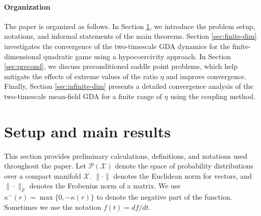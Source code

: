 \documentclass[11pt]{article}
\newcommand{\1}{\mathds{1}}
\begin{document}
\paragraph{Organization} 
The paper is organized as follows. In Section \ref{sec:setup}, we introduce the problem setup, notations, and informal statements of the main theorems. Section \ref{sec:finite-dim} investigates the convergence of the two-timescale GDA dynamics for the finite-dimensional quadratic game using a hypocoercivity approach. In Section \ref{sec:precond}, we discuss preconditioned saddle point problems, which help mitigate the effects of extreme values of the ratio $\eta$ and improve convergence. Finally, Section \ref{sec:infinite-dim} presents a detailed convergence analysis of the two-timescale mean-field GDA for a finite range of $\eta$ using the coupling method.

\section{Setup and main results}\label{sec:setup}
This section provides preliminary calculations, definitions, and notations used throughout the paper. Let $\mathcal{P}(\mathcal{X})$ denote the space of probability distributions over a compact manifold $\mathcal{X}$. $\|\cdot\|$ denotes the Euclidean norm for vectors, and $\|\cdot\|_F$ denotes the Frobenius norm of a matrix. We use $\kappa^{-}(r)=\max\{0,-\kappa(r)\}$ to denote the negative part of the function. Sometimes we use the notation $\dot{f}(t) = df/dt$.
\end{document}
